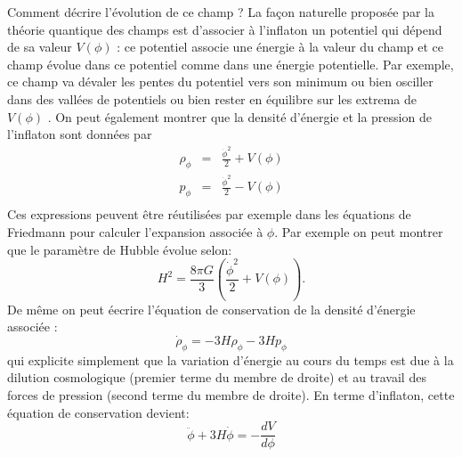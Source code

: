 Comment décrire l'évolution de ce champ ? La façon naturelle proposée par la théorie quantique des champs est d'associer à l'inflaton un potentiel qui dépend de sa valeur $V(\phi)$  : ce potentiel associe une énergie à la valeur du champ et ce champ évolue dans ce potentiel comme dans une énergie potentielle. Par exemple, ce champ va dévaler les pentes du potentiel vers son minimum ou bien osciller dans des vallées de potentiels ou bien rester en équilibre sur les extrema de $V(\phi)$ . On peut également montrer que la densité d'énergie et la pression de l'inflaton sont données par  
\begin{eqnarray}
\rho_\phi&=&\frac{\dot \phi^2}{2}+V(\phi)\\
p_\phi&=&\frac{\dot \phi^2}{2}-V(\phi)\\
\end{eqnarray}
Ces expressions peuvent être réutilisées par exemple dans les équations de Friedmann pour calculer l'expansion associée à $\phi$. Par exemple on peut montrer que le paramètre de Hubble évolue selon:
\begin{equation}
H^2=\frac{8\pi G}{3}\left(\frac{\dot \phi^2}{2}+V(\phi)\right).
\label{e:hubbleinf}
\end{equation}
De même on peut éecrire l'équation de conservation de la densité d'énergie associée :
\begin{equation}
\dot \rho_\phi= -3H\rho_\phi-3Hp_\phi
\end{equation}
qui explicite simplement que la variation d'énergie au cours du temps est due à la dilution cosmologique (premier terme du membre de droite) et au travail des forces de pression (second terme du membre de droite). En terme d'inflaton, cette équation de conservation devient:
\begin{equation}
\ddot \phi+ 3H \dot \phi = -\frac{d V}{d\phi}
\end{equation}

